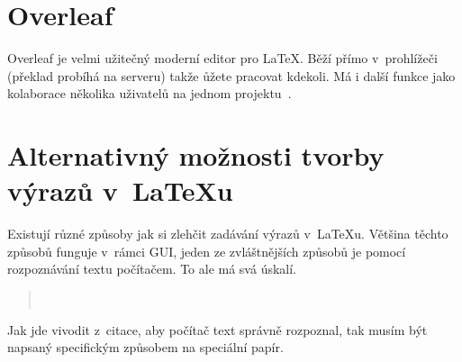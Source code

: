 \documentclass[11pt, a4paper, hyphens]{article}
\begin{document}
\section{Overleaf}
Overleaf je velmi užitečný moderní editor pro \LaTeX. Běží přímo v~prohlížeči (překlad probíhá na serveru) takže
ůžete pracovat kdekoli. Má i další funkce jako kolaborace několika uživatelů na jednom projektu~\cite{NovotnyVit2021OCOL}.

\section{Alternativný možnosti tvorby výrazů v~\LaTeX u}
Existují různé způsoby jak si zlehčit zadávání výrazů v~\LaTeX u. Většina těchto způsobů funguje v~rámci GUI, jeden ze zvláštnějších způsobů
je pomocí rozpoznávání textu počítačem. To ale má svá úskalí.
\begin{quotation}
    ~\cite{1394451}
\end{quotation}
Jak jde vivodit z~citace, aby počítač text správně rozpoznal, tak musím být napsaný specifickým způsobem na speciální papír.



\end{document}
